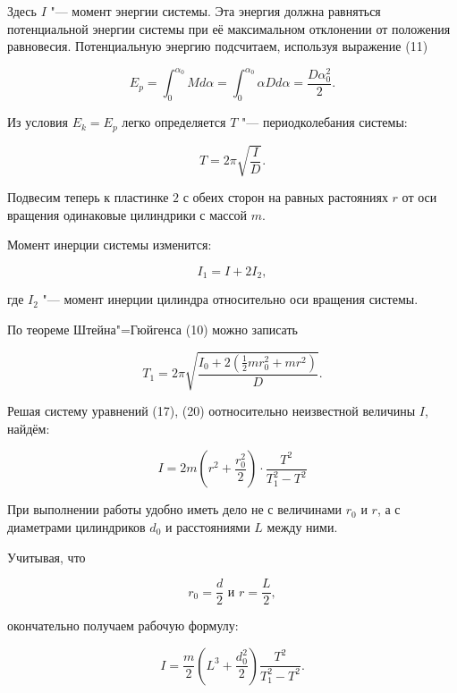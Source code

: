 Здесь $I$ "--- момент энергии системы.
Эта энергия должна равняться потенциальной энергии системы при её максимальном отклонении от положения равновесия.
Потенциальную энергию подсчитаем, используя выражение (11)

\begin{equation}
    E_p = \int_{0}^{\alpha_0} Md\alpha = \int_{0}^{\alpha_0} \alpha Dd\alpha = \frac{D\alpha_0^2}{2}.
\end{equation}

Из условия $E_k = E_p$ легко определяется $T$ "--- периодколебания системы:

\begin{equation}
    T = 2\pi\sqrt{\frac{I}{D}}.
\end{equation}

Подвесим теперь к пластинке $2$ с обеих сторон на равных растояниях $r$
от оси вращения одинаковые цилиндрики с массой $m$.

Момент инерции системы изменится:

\begin{equation}
    I_1 = I + 2I_2,
\end{equation}

где $I_2$ "--- момент инерции цилиндра относительно оси вращения системы.

По теореме Штейна"=Гюйгенса (10) можно записать

\begin{equation}
    T_1 = 2\pi\sqrt{\frac{I_0 + 2(\frac{1}{2}mr_0^2 + mr^2)}{D}}.
\end{equation}

Решая систему уравнений (17), (20) оотносительно неизвестной величины $I$, найдём:

\begin{equation}
    I = 2m(r^2 + \frac{r_0^2}{2})\cdot\frac{T^2}{T_1^2 - T^2}
\end{equation}

При выполнении работы удобно иметь дело не с величинами $r_0$ и $r$, а с диаметрами цилиндриков  $d_0$ и расстояниями $L$ между ними.

Учитывая, что

\begin{equation}
    r_0 = \frac{d}{2}
    \text{ и } 
    r = \frac{L}{2},
\end{equation}

окончательно получаем рабочую формулу:

\begin{equation}
    I = \frac{m}{2}(L^3 + \frac{d_0^2}{2})\frac{T^2}{T_1^2 - T^2}.
\end{equation}